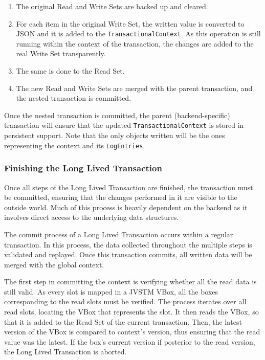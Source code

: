 \begin{enumerate}

\item The original Read and Write Sets are backed up and cleared.

\item For each item in the original Write Set, the written value is
  converted to JSON and it is added to the
  \texttt{TransactionalContext}. As this operation is still running
  within the context of the transaction, the changes are added to the
  real Write Set transparently.

\item The same is done to the Read Set.

\item The new Read and Write Sets are merged with the parent
  transaction, and the nested transaction is committed.

\end{enumerate}

Once the nested transaction is committed, the parent
(backend-specific) transaction will ensure that the updated
\texttt{TransactionalContext} is stored in persistent support. Note
that the only objects written will be the ones representing the
context and its \texttt{LogEntries}.

\subsubsection{Finishing the Long Lived Transaction}
\label{sec:jvstm-commit}

Once all steps of the Long Lived Transaction are finished, the
transaction must be committed, ensuring that the changes performed in
it are visible to the outside world. Much of this process is heavily
dependent on the backend as it involves direct access to the
underlying data structures.

The commit process of a Long Lived Transaction occurs within a regular
transaction. In this process, the data collected throughout the
multiple steps is validated and replayed. Once this transaction
commits, all written data will be merged with the global context.

The first step in committing the context is verifying whether all the
read data is still valid. As every slot is mapped in a JVSTM VBox, all
the boxes corresponding to the read slots must be verified. The
process iterates over all read slots, locating the VBox that
represents the slot. It then reads the VBox, so that it is added to
the Read Set of the current transaction. Then, the latest version of
the VBox is compared to context's version, thus ensuring that the read
value was the latest. If the box's current version if posterior to the
read version, the Long Lived Transaction is aborted.

